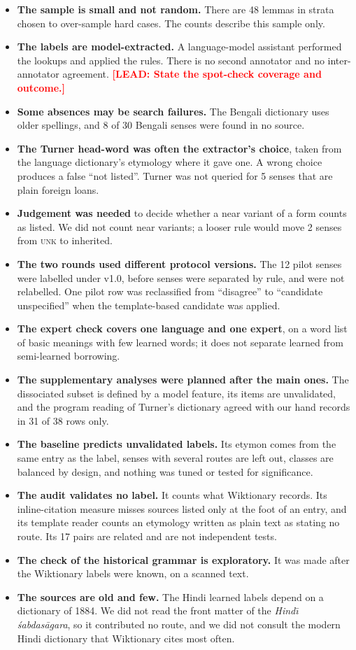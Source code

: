 \documentclass[11pt]{article}
\newcommand{\lead}[1]{\textcolor{red}{\textbf{[LEAD: #1]}}}
\newcommand{\lbl}[1]{\textsc{#1}}
\begin{document}
\begin{itemize}
\item \textbf{The sample is small and not random.} There are 48 lemmas in strata chosen to over-sample hard cases. The counts describe this sample only.
\item \textbf{The labels are model-extracted.} A language-model assistant performed the lookups and applied the rules. There is no second annotator and no inter-annotator agreement. \lead{State the spot-check coverage and outcome.}
\item \textbf{Some absences may be search failures.} The Bengali dictionary uses older spellings, and 8 of 30 Bengali senses were found in no source.
\item \textbf{The Turner head-word was often the extractor's choice}, taken from the language dictionary's etymology where it gave one. A wrong choice produces a false ``not listed''. Turner was not queried for 5 senses that are plain foreign loans.
\item \textbf{Judgement was needed} to decide whether a near variant of a form counts as listed. We did not count near variants; a looser rule would move 2 senses from \lbl{unk} to inherited.
\item \textbf{The two rounds used different protocol versions.} The 12 pilot senses were labelled under v1.0, before senses were separated by rule, and were not relabelled. One pilot row was reclassified from ``disagree'' to ``candidate unspecified'' when the template-based candidate was applied.
\item \textbf{The expert check covers one language and one expert}, on a word list of basic meanings with few learned words; it does not separate learned from semi-learned borrowing.
\item \textbf{The supplementary analyses were planned after the main ones.} The dissociated subset is defined by a model feature, its items are unvalidated, and the program reading of Turner's dictionary agreed with our hand records in 31 of 38 rows only.
\item \textbf{The baseline predicts unvalidated labels.} Its etymon comes from the same entry as the label, senses with several routes are left out, classes are balanced by design, and nothing was tuned or tested for significance.
\item \textbf{The audit validates no label.} It counts what Wiktionary records. Its inline-citation measure misses sources listed only at the foot of an entry, and its template reader counts an etymology written as plain text as stating no route. Its 17 pairs are related and are not independent tests.
\item \textbf{The check of the historical grammar is exploratory.} It was made after the Wiktionary labels were known, on a scanned text.
\item \textbf{The sources are old and few.} The Hindi learned labels depend on a dictionary of 1884. We did not read the front matter of the \textit{Hind\=\i{} \'sabdas\=agara}, so it contributed no route, and we did not consult the modern Hindi dictionary that Wiktionary cites most often.
\end{itemize}
\end{document}
